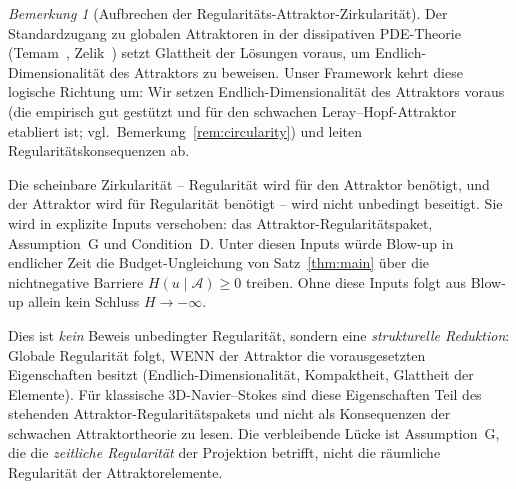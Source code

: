 \documentclass[12pt,a4paper]{article}
\theoremstyle{definition}
\theoremstyle{plain}
\theoremstyle{remark}
\newtheorem{remark}[definition]{Bemerkung}
\begin{document}
\begin{remark}[Aufbrechen der Regularitäts-Attraktor-Zirkularität]
\label{rem:circularity-discussion}
Der Standardzugang zu globalen Attraktoren in der dissipativen
PDE-Theorie (Temam~\cite{Temam2001}, Zelik~\cite{Zelik2014}) setzt
Glattheit der Lösungen voraus, um Endlich-Dimensionalität des
Attraktors zu beweisen. Unser Framework kehrt diese logische
Richtung um: Wir setzen Endlich-Dimensionalität des Attraktors
voraus (die empirisch gut gestützt und für den schwachen
Leray--Hopf-Attraktor etabliert ist; vgl.\
Bemerkung~\ref{rem:circularity}) und leiten
Regularitätskonsequenzen ab.

Die scheinbare Zirkularität -- Regularität wird für den Attraktor
benötigt, und der Attraktor wird für Regularität benötigt -- wird
nicht unbedingt beseitigt. Sie wird in explizite Inputs verschoben:
das Attraktor-Regularitätspaket, Assumption~G und Condition~D.
Unter diesen Inputs würde Blow-up in endlicher Zeit die Budget-Ungleichung
von Satz~\ref{thm:main} über die nichtnegative Barriere
$H(u \mid \mathcal{A}) \ge 0$ treiben. Ohne diese Inputs folgt aus
Blow-up allein kein Schluss $H\to-\infty$.

Dies ist \emph{kein} Beweis unbedingter Regularität, sondern eine
\emph{strukturelle Reduktion}: Globale Regularität folgt, WENN
der Attraktor die vorausgesetzten Eigenschaften besitzt
(Endlich-Dimensionalität, Kompaktheit, Glattheit der Elemente).
Für klassische 3D-Navier--Stokes sind diese Eigenschaften Teil des
stehenden Attraktor-Regularitätspakets und nicht als Konsequenzen der
schwachen Attraktortheorie zu lesen. Die verbleibende Lücke ist
Assumption~G, die die \emph{zeitliche Regularität} der Projektion
betrifft, nicht die räumliche Regularität der Attraktorelemente.
\end{remark}
\end{document}
